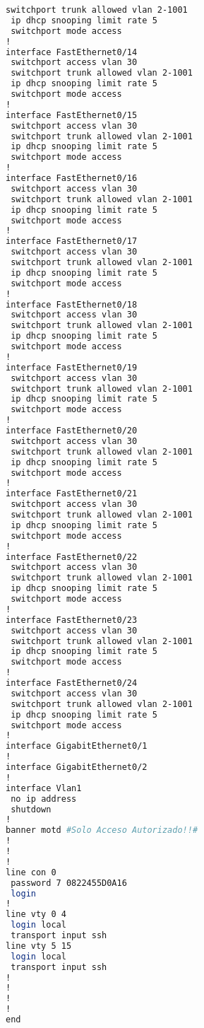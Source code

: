 \begin{lstlisting}[language=Bash, caption={Configuración Completa Switch Oftalmologia}]
 switchport trunk allowed vlan 2-1001
 ip dhcp snooping limit rate 5
 switchport mode access
!
interface FastEthernet0/14
 switchport access vlan 30
 switchport trunk allowed vlan 2-1001
 ip dhcp snooping limit rate 5
 switchport mode access
!
interface FastEthernet0/15
 switchport access vlan 30
 switchport trunk allowed vlan 2-1001
 ip dhcp snooping limit rate 5
 switchport mode access
!
interface FastEthernet0/16
 switchport access vlan 30
 switchport trunk allowed vlan 2-1001
 ip dhcp snooping limit rate 5
 switchport mode access
!
interface FastEthernet0/17
 switchport access vlan 30
 switchport trunk allowed vlan 2-1001
 ip dhcp snooping limit rate 5
 switchport mode access
!
interface FastEthernet0/18
 switchport access vlan 30
 switchport trunk allowed vlan 2-1001
 ip dhcp snooping limit rate 5
 switchport mode access
!
interface FastEthernet0/19
 switchport access vlan 30
 switchport trunk allowed vlan 2-1001
 ip dhcp snooping limit rate 5
 switchport mode access
!
interface FastEthernet0/20
 switchport access vlan 30
 switchport trunk allowed vlan 2-1001
 ip dhcp snooping limit rate 5
 switchport mode access
!
interface FastEthernet0/21
 switchport access vlan 30
 switchport trunk allowed vlan 2-1001
 ip dhcp snooping limit rate 5
 switchport mode access
!
interface FastEthernet0/22
 switchport access vlan 30
 switchport trunk allowed vlan 2-1001
 ip dhcp snooping limit rate 5
 switchport mode access
!
interface FastEthernet0/23
 switchport access vlan 30
 switchport trunk allowed vlan 2-1001
 ip dhcp snooping limit rate 5
 switchport mode access
!
interface FastEthernet0/24
 switchport access vlan 30
 switchport trunk allowed vlan 2-1001
 ip dhcp snooping limit rate 5
 switchport mode access
!
interface GigabitEthernet0/1
!
interface GigabitEthernet0/2
!
interface Vlan1
 no ip address
 shutdown
!
banner motd #Solo Acceso Autorizado!!#
!
!
!
line con 0
 password 7 0822455D0A16
 login
!
line vty 0 4
 login local
 transport input ssh
line vty 5 15
 login local
 transport input ssh
!
!
!
!
end
\end{lstlisting}
